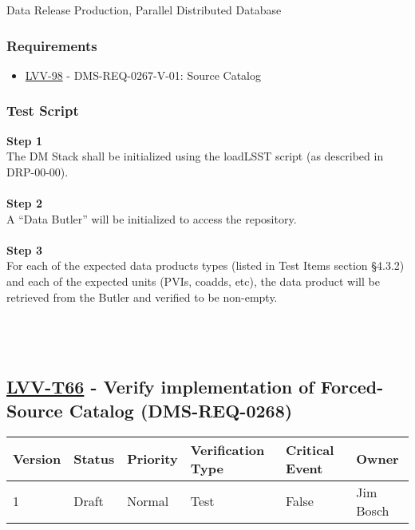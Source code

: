 Data Release Production, Parallel Distributed Database

\hypertarget{requirements-42}{%
\subsubsection{Requirements}\label{requirements-42}}

\begin{itemize}
\tightlist
\item
  \href{https://jira.lsstcorp.org/browse/LVV-98}{LVV-98} -
  DMS-REQ-0267-V-01: Source Catalog
\end{itemize}

\hypertarget{test-script-42}{%
\subsubsection{Test Script}\label{test-script-42}}

\textbf{Step 1}\\
The DM Stack shall be initialized using the loadLSST script (as
described in DRP-00-00).\\
~\\
\textbf{Step 2}\\
A ``Data Butler'' will be initialized to access the repository.\\
~\\
\textbf{Step 3}\\
For each of the expected data products types (listed in Test Items
section §4.3.2) and each of the expected units (PVIs, coadds, etc), the
data product will be retrieved from the Butler and verified to be
non-empty.\\
~\\
~\\
~\\

\hypertarget{lvv-t66---verify-implementation-of-forced-source-catalog-dms-req-0268}{%
\subsection{\texorpdfstring{\href{https://jira.lsstcorp.org/secure/Tests.jspa\#/testCase/LVV-T66}{LVV-T66}
- Verify implementation of Forced-Source Catalog
(DMS-REQ-0268)}{LVV-T66 - Verify implementation of Forced-Source Catalog (DMS-REQ-0268)}}\label{lvv-t66---verify-implementation-of-forced-source-catalog-dms-req-0268}}

\begin{longtable}[]{@{}llllll@{}}
\toprule
Version & Status & Priority & Verification Type & Critical Event &
Owner\tabularnewline
\midrule
\endhead
1 & Draft & Normal & Test & False & Jim Bosch\tabularnewline
\bottomrule
\end{longtable}

